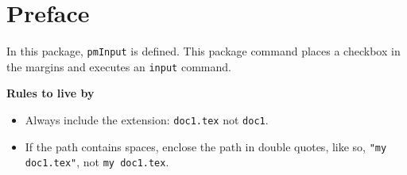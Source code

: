 \documentclass{book}
\def\cs#1{\texttt{\eqbs#1}}
\begin{document}
\chapter*{Preface}

In this package, \cs{pmInput} is defined. This package command places a checkbox
in the margins and executes an \cs{input} command.

\medskip\noindent\textbf{Rules to live by}\begin{itemize}
  \item Always include the extension: \texttt{doc1.tex} not \texttt{doc1}.
  \item If the path contains spaces, enclose the path in double quotes, like so,
  \texttt{"my doc1.tex"}, not \texttt{my doc1.tex}.
\end{itemize}



%

\medskip\noindent
\displayChoices{}{11bp}\cgBdry[1em]\clrChoices{}{11bp}
\end{document}
